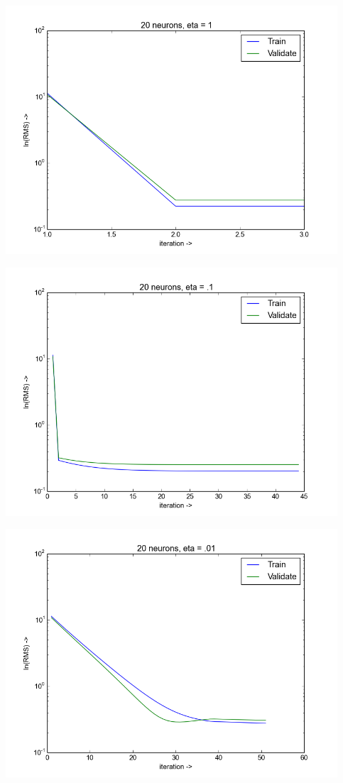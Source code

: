 \documentclass{article}
\theoremstyle{dotless}
\begin{document}
\includegraphics[keepaspectratio=true, width=350pt]{src/img/n_20_eta_1.png}

\includegraphics[keepaspectratio=true, width=350pt]{src/img/n_20_eta_01.png}

\includegraphics[keepaspectratio=true, width=350pt]{src/img/n_20_eta_001.png}
\end{document}
